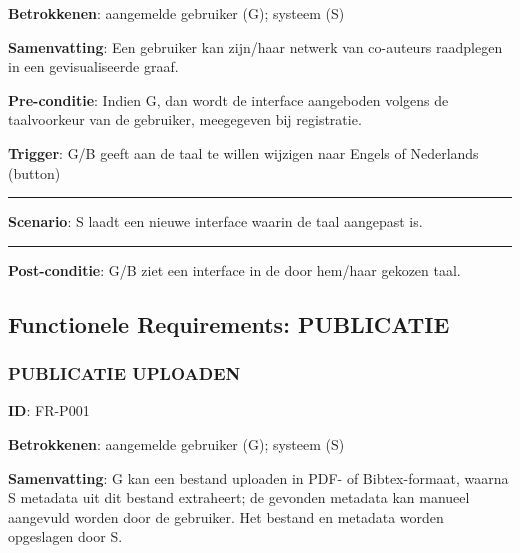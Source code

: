 \noindent \textbf{Betrokkenen}: aangemelde gebruiker (G); systeem (S) 
\vspace{2 mm}

\noindent \textbf{Samenvatting}: Een gebruiker kan zijn/haar netwerk van co-auteurs raadplegen in een gevisualiseerde graaf. 
\vspace{2 mm}

\noindent \textbf{Pre-conditie}: Indien G, dan wordt de interface aangeboden volgens de taalvoorkeur van de gebruiker, meegegeven bij registratie.
\vspace{2 mm}

\noindent \textbf{Trigger}: G/B geeft aan de taal te willen wijzigen naar Engels of Nederlands (button)

\vspace{4 mm}
\hrule
\vspace{2 mm}
\noindent \textbf{Scenario}:
\noindent S laadt een nieuwe interface waarin de taal aangepast is.
\vspace{2 mm}
\hrule
\vspace{4 mm}

\noindent \textbf{Post-conditie}: G/B ziet een interface in de door hem/haar gekozen taal. \\






\clearpage




\subsection{Functionele Requirements: PUBLICATIE}
\vspace{4 mm}

\subsubsection{PUBLICATIE UPLOADEN}
\vspace{2 mm}

\textbf{ID}: FR-P001
\vspace{2 mm}

\noindent \textbf{Betrokkenen}: aangemelde gebruiker (G); systeem (S) 
\vspace{2 mm}

\noindent \textbf{Samenvatting}: G kan een bestand uploaden in PDF- of Bibtex-formaat, waarna S metadata uit dit bestand extraheert; de gevonden metadata kan manueel aangevuld worden door de gebruiker. Het bestand en metadata worden opgeslagen door S. 
\vspace{2 mm}

